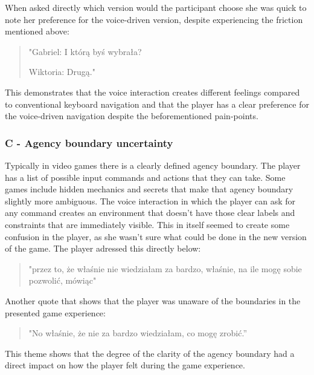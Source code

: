 When asked directly which version would the participant choose she was quick to note her preference for the voice-driven version, despite experiencing the friction mentioned above:

\begin{quote}
    "Gabriel: I którą byś wybrała?


    Wiktoria: Drugą."
\end{quote}

This demonstrates that the voice interaction creates different feelings compared to conventional keyboard navigation and that the player has a clear preference for the voice-driven navigation despite the beforementioned pain-points.


\subsubsection{C - Agency boundary uncertainty}


Typically in video games there is a clearly defined agency boundary. The player has a list of possible input commands and actions that they can take. Some games include hidden mechanics and secrets that make that agency boundary slightly more ambiguous. The voice interaction in which the player can ask for any command creates an environment that doesn't have those clear labels and constraints that are immediately visible. This in itself seemed to create some confusion in the player, as she wasn't sure what could be done in the new version of the game. The player adressed this directly below:

\begin{quote}
    "przez to, że właśnie nie wiedziałam za bardzo, właśnie, na ile mogę sobie pozwolić, mówiąc"
\end{quote}

Another quote that shows that the player was unaware of the boundaries in the presented game experience:
\begin{quote}
    "No właśnie, że nie za bardzo wiedziałam, co mogę zrobić.”
\end{quote}

This theme shows that the degree of the clarity of the agency boundary had a direct impact on how the player felt during the game experience. 


